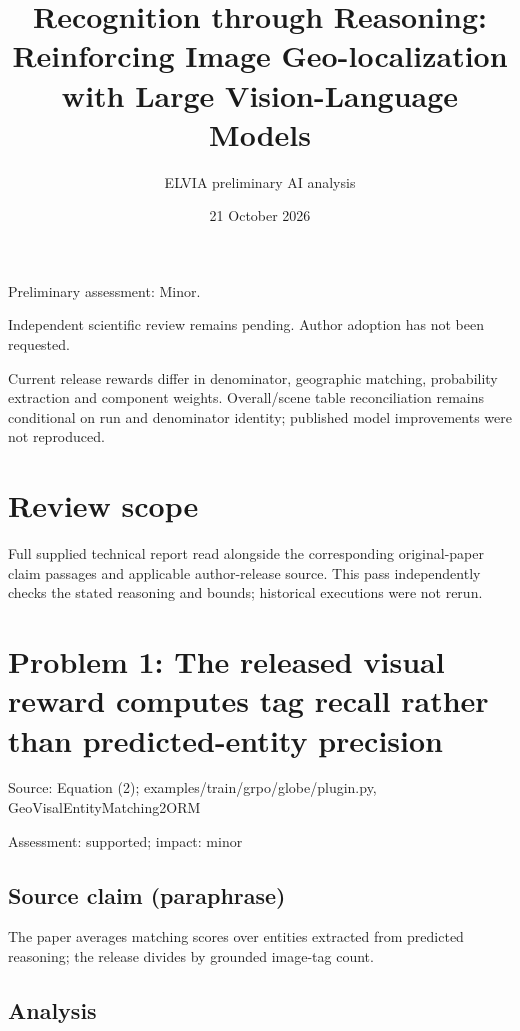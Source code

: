 \documentclass[11pt]{article}
\begin{document}
\title{Recognition through Reasoning: Reinforcing Image Geo-localization with Large Vision-Language Models}

\author{ELVIA preliminary AI analysis}\date{21 October 2026}\maketitle

Preliminary assessment: Minor.\par

Independent scientific review remains pending. Author adoption has not been requested.

Current release rewards differ in denominator, geographic matching, probability extraction and component weights. Overall/scene table reconciliation remains conditional on run and denominator identity; published model improvements were not reproduced.

\section*{Review scope}

Full supplied technical report read alongside the corresponding original-paper claim passages and applicable author-release source. This pass independently checks the stated reasoning and bounds; historical executions were not rerun.

\section*{Problem 1: The released visual reward computes tag recall rather than predicted-entity precision}

Source: Equation (2); examples/train/grpo/globe/plugin.py, GeoVisalEntityMatching2ORM

Assessment: supported; impact: minor

\subsection*{Source claim (paraphrase)}

The paper averages matching scores over entities extracted from predicted reasoning; the release divides by grounded image-tag count.

\subsection*{Analysis}
\end{document}

